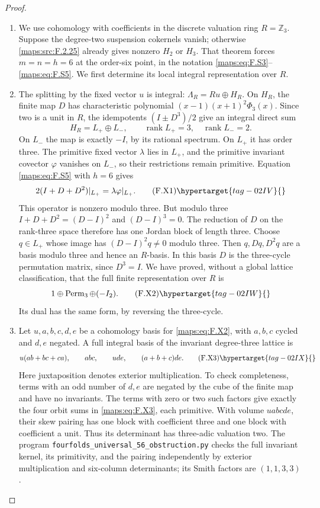 \begin{proof}
\begin{enumerate}[label={$\langle1\rangle$\arabic*.}]
\item We use cohomology with coefficients in the discrete valuation
ring $R=\mathbb Z_3$.  Suppose the degree-two suspension
cokernels vanish; otherwise \ref{maps:src:F.2.25} already gives nonzero
$H_2$ or $H_3$.  That theorem forces $m=n=h=6$ at the
order-six point, in the notation \eqref{maps:eq:F.S3}--\eqref{maps:eq:F.S5}.
We first determine its local integral representation over $R$.

\item The splitting by the fixed vector $u$ is integral:
$\Lambda_R=Ru\oplus H_R$.  On $H_R$, the finite map $D$
has characteristic polynomial
$(x-1)(x+1)^2\Phi_3(x)$.  Since two is a unit in $R$,
the idempotents $(I\pm D^3)/2$ give an integral direct sum
\[
 H_R=L_+\oplus L_-,\qquad
 \operatorname{rank}L_+=3,\quad
 \operatorname{rank}L_-=2.
\]
On $L_-$ the map is exactly $-I$, by its rational spectrum.
On $L_+$ it has order three.  The primitive fixed vector
$\lambda$ lies in $L_+$, and the primitive invariant
covector $\varphi$ vanishes on $L_-$, so their restrictions
remain primitive.  Equation \eqref{maps:eq:F.S5} with $h=6$ gives
\[
 2(I+D+D^2)|_{L_+}=\lambda\varphi|_{L_+}.
 \tag{F.X1}\hypertarget{tag-02IV}{}\label{maps:eq:F.X1}
\]
This operator is nonzero modulo three.  But modulo three
$I+D+D^2=(D-I)^2$ and $(D-I)^3=0$.  The reduction of $D$
on the rank-three space therefore has one Jordan block
of length three.  Choose $q\in L_+$ whose image has
$(D-I)^2q\ne0$ modulo three.  Then $q,Dq,D^2q$ are a
basis modulo three and hence an $R$-basis.  In this basis
$D$ is the three-cycle permutation matrix, since $D^3=I$.
We have proved, without a global lattice classification,
that the full finite representation over $R$ is
\[
                   1\oplus\operatorname{Perm}_3\oplus(-I_2).
 \tag{F.X2}\hypertarget{tag-02IW}{}\label{maps:eq:F.X2}
\]
Its dual has the same form, by reversing the three-cycle.

\item Let $u,a,b,c,d,e$ be a cohomology basis for \eqref{maps:eq:F.X2}, with
$a,b,c$ cycled and $d,e$ negated.  A full integral basis
of the invariant degree-three lattice is
\[
 u(ab+bc+ca),\qquad abc,\qquad ude,\qquad(a+b+c)de.
 \tag{F.X3}\hypertarget{tag-02IX}{}\label{maps:eq:F.X3}
\]
Here juxtaposition denotes exterior multiplication.
To check completeness, terms with an odd number of
$d,e$ are negated by the cube of the finite map and
have no invariants.  The terms with zero or two such
factors give exactly the four orbit sums in \eqref{maps:eq:F.X3},
each primitive.  With volume $uabcde$, their skew
pairing has one block with coefficient three and one
block with coefficient a unit.  Thus its determinant
has three-adic valuation two.  The program \texttt{fourfolds\_universal\_56\_obstruction.py} checks
the full invariant kernel, its primitivity, and the
pairing independently by exterior multiplication and
six-column determinants; its Smith factors are
$(1,1,3,3)$.


\end{enumerate}
\end{proof}
